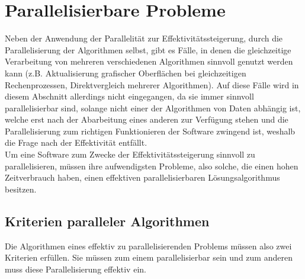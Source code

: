 \section{Parallelisierbare Probleme}
Neben der Anwendung der Parallelität zur Effektivitätssteigerung, durch die Parallelisierung der Algorithmen selbst, gibt es Fälle, in denen die gleichzeitige Verarbeitung von mehreren verschiedenen Algorithmen sinnvoll genutzt werden kann (z.B. Aktualisierung grafischer Oberflächen bei gleichzeitigen Rechenprozessen, Direktvergleich mehrerer Algorithmen). Auf diese Fälle wird in diesem Abschnitt allerdings nicht eingegangen, da sie immer sinnvoll parallelisierbar sind, solange nicht einer der Algorithmen von Daten abhängig ist, welche erst nach der Abarbeitung eines anderen zur Verfügung stehen und die Parallelisierung zum richtigen Funktionieren der Software zwingend ist, weshalb die Frage nach der Effektivität entfällt.\\
Um eine Software zum Zwecke der Effektivitätssteigerung sinnvoll zu parallelisieren, müssen ihre aufwendigsten Probleme, also solche, die einen hohen Zeitverbrauch haben, einen effektiven parallelisierbaren Lösungsalgorithmus besitzen.

\subsection{Kriterien paralleler Algorithmen}
Die Algorithmen eines effektiv zu parallelisierenden Problems müssen also zwei Kriterien erfüllen. Sie müssen zum einem parallelisierbar sein und zum anderen muss diese Parallelisierung effektiv ein.

